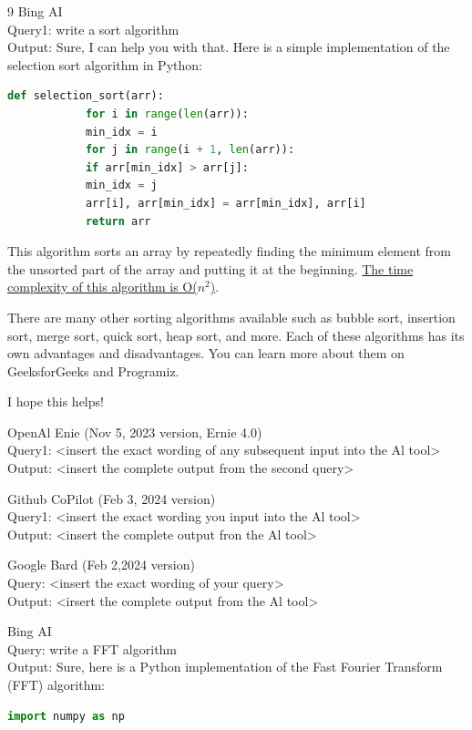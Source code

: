 \documentclass{mcmthesis}
\begin{document}
\begin{enumerate}
\begin{appendices}
	\end{appendices}
	\AImatter
	\begin{ReportAiUse}{9}
		Bing AI\\
		Query1: write a sort algorithm\\
		Output: Sure, I can help you with that. Here is a simple implementation of the selection sort algorithm in Python:
		\begin{lstlisting}[language=python]
			def selection_sort(arr):
			for i in range(len(arr)):
			min_idx = i
			for j in range(i + 1, len(arr)):
			if arr[min_idx] > arr[j]:
			min_idx = j
			arr[i], arr[min_idx] = arr[min_idx], arr[i]
			return arr
		\end{lstlisting}
		This algorithm sorts an array by repeatedly finding the minimum element from the unsorted part of the array and putting it at the beginning. \href{https://www.geeksforgeeks.org/sorting-algorithms/}{The time complexity of this algorithm is O($n^2$)}.
		
		There are many other sorting algorithms available such as bubble sort, insertion sort, merge sort, quick sort, heap sort, and more. Each of these algorithms has its own advantages and disadvantages. You can learn more about them on GeeksforGeeks and Programiz.
		
		I hope this helps!
		
		OpenAl Enie (Nov 5, 2023 version, Ernie 4.0)\\
		Query1: <insert the exact wording of any subsequent input into the Al tool>\\
		Output: <insert the complete output from the second query>
		
		Github CoPilot (Feb 3, 2024 version)\\
		Query1: <insert the exact wording you input into the Al tool>\\
		Output: <insert the complete output fron the Al tool>
		
		Google Bard (Feb 2,2024 version)\\
		Query: <insert the exact wording of your query>\\
		Output: <irsert the complete output from the Al tool>
		
		Bing AI\\
		Query: write a FFT algorithm\\
		Output: Sure, here is a Python implementation of the Fast Fourier Transform (FFT) algorithm:
		\begin{lstlisting}[language=python]
			import numpy as np
			

\end{lstlisting}
\end{ReportAiUse}
\end{enumerate}
\end{document}
